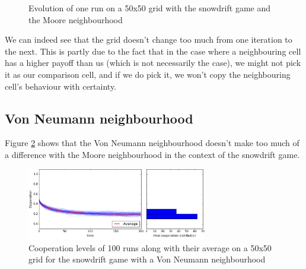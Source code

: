 \documentclass[a4paper]{article}
\begin{document}
\begin{figure}[H]
	\caption{Evolution of one run on a 50x50 grid with the snowdrift game
	and the Moore neighbourhood}
	\label{sdrun}
\end{figure}

We can indeed see that the grid doesn't change too much from one iteration to
the next. This is partly due to the fact that in the case where a neighbouring
cell has a higher payoff than us (which is not necessarily the case), we might
not pick it as our comparison cell, and if we do pick it, we won't copy the
neighbouring cell's behaviour with certainty.

\subsection{Von Neumann neighbourhood}
Figure \ref{sd_vn50} shows that the Von Neumann neighbourhood doesn't make 
too much of a difference with the Moore neighbourhood in the context of the 
snowdrift game.
\begin{figure}[H]
	\centering
	\includegraphics[width=0.7\textwidth]{./fig/sd_vn_50.png}
	\caption{Cooperation levels of 100 runs along with their average
	on a 50x50 grid for the snowdrift game with a Von Neumann neighbourhood}
	\label{sd_vn50}
\end{figure}
\end{document}
